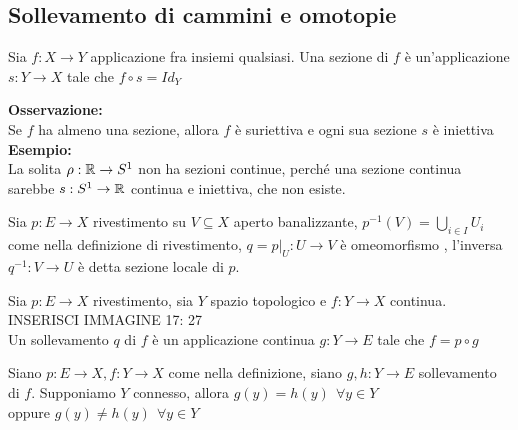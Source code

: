 \documentclass[12px]{article}
\begin{document}
\subsection{Sollevamento di cammini e omotopie}
\begin{defi}
	Sia $f: X \rightarrow Y$ applicazione fra insiemi qualsiasi. Una sezione di $f$ è un'applicazione $s: Y \rightarrow X$ tale che $f\circ s = Id_Y$
\end{defi}
\textbf{Osservazione:}\\
Se $f$ ha almeno una sezione, allora $f $ è suriettiva e ogni sua sezione $s $ è iniettiva\\
\textbf{Esempio:}\\
La solita $\rho : \mathbb{R} \rightarrow S^1$ non ha sezioni continue, perché una sezione continua sarebbe $s: S^1 \rightarrow \mathbb{R}$ continua e iniettiva, che non esiste.
\begin{defi}
	Sia $p: E \rightarrow X$ rivestimento su $V\subseteq X$ aperto banalizzante,  $p^{-1}(V) = \bigcup^{}_{i\in I}U_i$ come nella definizione di rivestimento, $q = p|_U : U \rightarrow V$ è omeomorfismo , l'inversa $q^{-1}:V \rightarrow U$  è detta sezione locale di $p$.
\end{defi}
\begin{defi}
	Sia $p: E \rightarrow X$ rivestimento, sia $Y$ spazio topologico e $f: Y \rightarrow X$ continua.\\
	INSERISCI IMMAGINE 17: 27\\
	Un sollevamento $q$ di $f$ è un applicazione continua $g: Y \rightarrow E$ tale che $f = p\circ g$
\end{defi}
\begin{teo}
	Siano $p: E \rightarrow X, f: Y \rightarrow X$ come nella definizione, siano $g,h: Y \rightarrow E$ sollevamento di $f.$ Supponiamo $ Y $ connesso, allora  $g(y) = h(y) \ \ \forall y\in Y$\\
	oppure  $g(y) \neq h(y) \ \ \forall y\in Y$
\end{teo}
\end{document}
